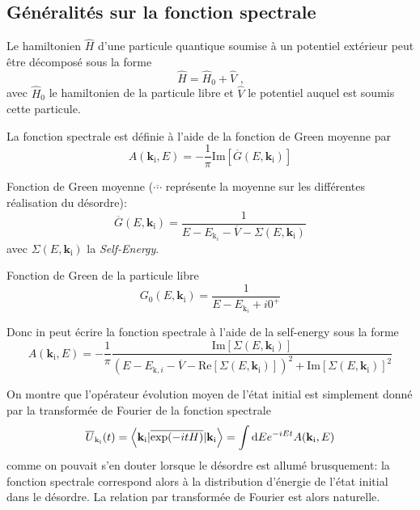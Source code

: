 \subsection{Généralités sur la fonction spectrale}
Le hamiltonien $\hat{H}$ d'une particule quantique soumise à un potentiel extérieur peut être décomposé sous la forme
\begin{equation}
\hat{H}=\hat{H}_0+\hat{V} \text{ ,}
\end{equation}
avec $\hat{H}_0$ le hamiltonien de la particule libre et $\hat{V}$ le potentiel auquel est soumis cette particule. 

La fonction spectrale est définie à l'aide de la fonction de Green moyenne par
\begin{equation}
A(\mathbf{k}_{\mathrm{i}},E)= -\frac{1}{\pi} \mathrm{Im}[\overline{G}(E,\mathbf{k}_{\mathrm{i}})]
\end{equation}

Fonction de Green moyenne ($\overline{\cdots}$ représente la moyenne sur les différentes réalisation du désordre):
\begin{equation}
\overline{G}(E,\mathbf{k}_{\mathrm{i}})=\frac{1}{E-E_{\mathrm{k}_i}-\overline{V}-\Sigma(E,\mathbf{k}_{\mathrm{i}})}
\end{equation}
avec $\Sigma(E,\mathbf{k}_{\mathrm{i}})$ la \emph{Self-Energy}.

Fonction de Green de la particule libre
\begin{equation}
G_0(E,\mathbf{k}_{\mathrm{i}})=\frac{1}{E-E_{\mathrm{k}_i}+i0^+}
\end{equation}

Donc in peut écrire la fonction spectrale à l'aide de la self-energy sous la forme
\begin{equation}
A(\mathbf{k}_{\mathrm{i}},E)=-\frac{1}{\pi}\frac{\mathrm{Im}[\Sigma(E,\mathbf{k}_{\mathrm{i}})]}{(E-E_{\mathrm{k},i}-\overline{V}-\mathrm{Re}[\Sigma(E,\mathbf{k}_{\mathrm{i}})])^2+\mathrm{Im}[\Sigma(E,\mathbf{k}_{\mathrm{i}})]^2}
\end{equation}

On montre que l'opérateur évolution moyen de l'état initial est simplement donné par la transformée de Fourier de la fonction spectrale
\begin{equation}
\overline{U}_{\mathrm{k}_{\mathrm{i}}}(t)=\left\langle \mathbf{k}_{\mathrm{i}} | \overline{\exp(-itH)}  | \mathbf{k}_{\mathrm{i}} \right\rangle = \int{\mathop{}\mathopen{}\mathrm{d}E e^{-iEt} A(\mathbf{k}_{\mathrm{i}},E)}
\end{equation}
comme on pouvait s'en douter lorsque le désordre est allumé brusquement: la fonction spectrale correspond alors à la distribution d'énergie de l'état initial dans le désordre. La relation par transformée de Fourier est alors naturelle.

